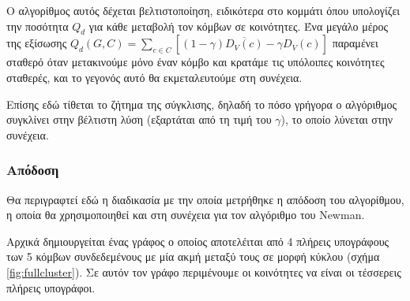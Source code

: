 \documentclass[10pt, letterpaper]{article}
\newcommand{\en}{\selectlanguage{english}}
\newcommand{\gr}{\selectlanguage{greek}}
\begin{document}
Ο αλγορίθμος αυτός δέχεται βελτιστοποίηση, ειδικότερα στο κομμάτι όπου 
υπολογίζει την ποσότητα $Q_d$ για κάθε μεταβολή τον κόμβων σε κοινότητες. 
Ένα μεγάλο μέρος της εξίσωσης $Q_d(G,C) = \sum_{c \in C} [(1 - \gamma)\overline{ D_V(c) } - \gamma D_V(c)]$
παραμένει σταθερό όταν μετακινούμε μόνο έναν κόμβο και κρατάμε τις υπόλοιπες κοινότητες
σταθερές, και το γεγονός αυτό θα εκμεταλευτούμε στη συνέχεια.

Επίσης εδώ τίθεται το ζήτημα της σύγκλισης, δηλαδή το πόσο γρήγορα ο αλγόριθμος συγκλίνει στην βέλτιστη λύση (εξαρτάται από 
τη τιμή του $\gamma$), το οποίο λύνεται στην συνέχεια.


\subsubsection{Απόδοση}

Θα περιγραφτεί εδώ η διαδικασία με την οποία μετρήθηκε η απόδοση του αλγορίθμου, η 
οποία θα χρησιμοποιηθεί και στη συνέχεια για τον αλγόριθμο του \en Newman. \gr

Αρχικά δημιουργείται ένας γράφος ο οποίος αποτελέιται από 4 πλήρεις υπογράφους 
των 5 κόμβων
συνδεδεμένους με μία ακμή μεταξύ τους σε μορφή κύκλου (σχήμα \ref{fig:fullcluster}).
Σε αυτόν τον γράφο περιμένουμε οι κοινότητες να είναι οι τέσσερεις πλήρεις υπογράφοι.
\end{document}
